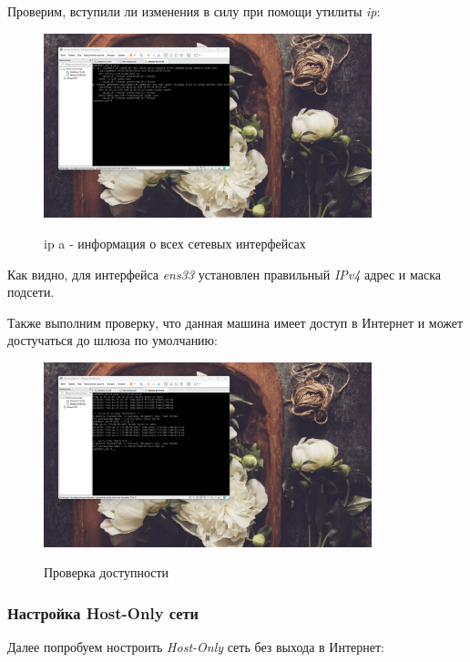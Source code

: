\documentclass[a4paper]{article}
\begin{document}
  Проверим, вступили ли изменения в силу при помощи утилиты \textit{ip}:

  \begin{figure}[H]
    \centering
    \includegraphics[width=0.85\textwidth]{06_00 (38)}
    \label{img:38}
    \caption{ip a - информация о всех сетевых интерфейсах}
  \end{figure}
  
  Как видно, для интерфейса \textit{ens33} установлен правильный \textit{IPv4} адрес и маска подсети.

  Также выполним проверку, что данная машина имеет доступ в Интернет и может достучаться до шлюза по умолчанию:

  \begin{figure}[H]
    \centering
    \includegraphics[width=0.85\textwidth]{06_00 (39)}
    \label{img:39}
    \caption{Проверка доступности}
  \end{figure}
  
  \subsubsection{Настройка Host-Only сети}

  Далее попробуем ностроить \textit{Host-Only} сеть без выхода в Интернет:
\end{document}
